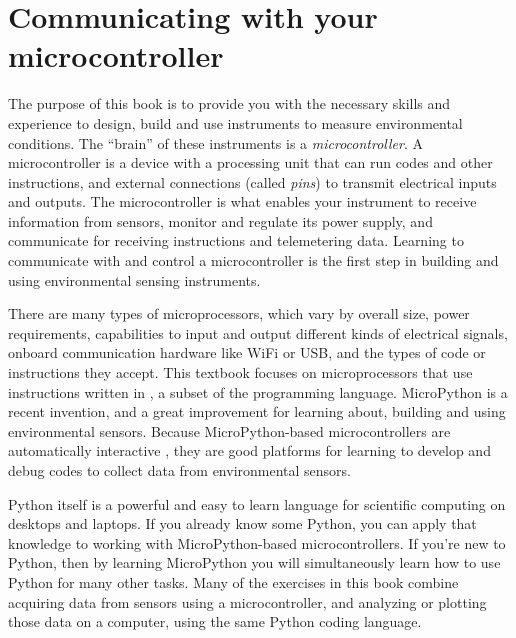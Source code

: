 
\setchapterpreamble[u]{\margintoc}
\chapter{Communicating with your microcontroller}

The purpose of this book is to provide you with the necessary skills and experience to design, build and use instruments to measure environmental conditions.
The ``brain'' of these instruments is a \emph{microcontroller}.
A microcontroller is a device with a processing unit that can run codes and other instructions, and external connections (called \emph{pins}) to transmit electrical inputs and outputs.
The microcontroller is what enables your instrument to receive information from sensors, monitor and regulate its power supply, and communicate for receiving instructions and telemetering data.
Learning to communicate with and control a microcontroller is the first step in building and using environmental sensing instruments.

There are many types of microprocessors, which vary by overall size, power requirements, capabilities to input and output different kinds of electrical signals, onboard communication hardware like WiFi or USB, and the types of code or instructions they accept.
%
This textbook focuses on microprocessors that use instructions written in , a subset of the  programming language.
MicroPython is a recent invention, and a great improvement for learning about, building and using environmental sensors.
Because MicroPython-based microcontrollers are automatically interactive
, they are good platforms for learning to develop and debug codes to collect data from environmental sensors.

Python itself is a powerful and easy to learn language for scientific computing on desktops and laptops.
If you already know some Python, you can apply that knowledge to working with MicroPython-based microcontrollers.
If you're new to Python, then by learning MicroPython you will simultaneously learn how to use Python for many other tasks.
Many of the exercises in this book combine acquiring data from sensors using a microcontroller, and analyzing or plotting those data on a computer, using the same Python coding language.

